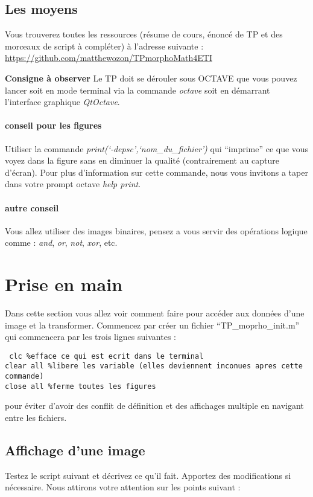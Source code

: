 \documentclass[10pt,a4paper]{article}
\begin{document}
\subsection{Les moyens}
Vous trouverez toutes les ressources (r\'{e}sume de cours, \'{e}nonc\'{e} de TP et des morceaux de script \`{a} compl\'{e}ter) \`{a} l'adresse suivante : \url{https://github.com/matthewozon/TPmorphoMath4ETI}

\noindent\textbf{Consigne \`{a} observer} Le TP doit se d\'{e}rouler sous OCTAVE que vous pouvez lancer soit en mode terminal via la commande \textit{octave} soit en d\'{e}marrant l'interface graphique \textit{QtOctave}.


\paragraph{conseil pour les figures} Utiliser la commande  \textit{print(`-depsc',`nom\_du\_fichier')}  qui ``imprime'' ce que vous voyez dans la figure sans en diminuer la qualit\'{e} (contrairement au capture d’\'{e}cran). Pour plus d'information sur cette commande, nous vous invitons a taper dans votre prompt octave \textit{help print}.

\paragraph{autre conseil} Vous allez utiliser des images binaires, pensez a vous servir des op\'{e}rations logique comme : \textit{and}, \textit{or}, \textit{not}, \textit{xor}, etc.




\section{Prise en main}
Dans cette section vous allez voir comment faire pour acc\'{e}der aux donn\'{e}es d'une image et la transformer. Commencez par cr\'{e}er un fichier ``TP\_moprho\_init.m'' qui commencera par les trois lignes suivantes : 
\begin{verbatim}
 clc %efface ce qui est ecrit dans le terminal
clear all %libere les variable (elles deviennent inconues apres cette commande)
close all %ferme toutes les figures
\end{verbatim}
pour \'{e}viter d'avoir des conflit de d\'{e}finition et des affichages multiple en navigant entre les fichiers.

\subsection{Affichage d'une image}
Testez le script suivant et d\'{e}crivez ce qu'il fait. Apportez des modifications si n\'{e}cessaire. Nous attirons votre attention sur les points suivant : 
\end{document}
